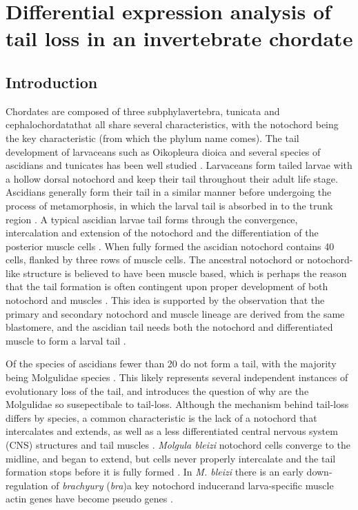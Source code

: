 \chapter{Differential expression analysis of tail loss in an invertebrate chordate}

\section{Introduction}

Chordates are composed of three subphyla\textemdash vertebra, tunicata and cephalochordata\textemdash that all share several characteristics, with the notochord being the key characteristic (from which the phylum name comes). The tail development of larvaceans such as Oikopleura dioica and several species of ascidians and tunicates has been well studied \cite{jeffery_factors_1992,nakatani_mutations_1999,kugler_evolutionary_2011}. Larvaceans form tailed larvae with a hollow dorsal notochord and keep their tail throughout their adult life stage. Ascidians generally form their tail in a similar manner before undergoing the process of metamorphosis, in which the larval tail is absorbed in to the trunk region \cite{paris_history_2008}. A typical ascidian larvae tail forms through the convergence, intercalation and extension of the notochord and the differentiation of the posterior muscle cells \cite{swalla_mechanisms_1993}. When fully formed the ascidian notochord contains 40 cells, flanked by three rows of muscle cells. The ancestral notochord or notochord-like structure is believed to have been muscle based, which is perhaps the reason that the tail formation is often contingent upon proper development of both notochord and muscles \cite{lauri_development_2014}. This idea is supported by the observation that the primary and secondary notochord and muscle lineage are derived from the same blastomere, and the ascidian tail needs both the notochord and differentiated muscle to form a larval tail \cite{nishida_cell_1987,di_gregorio_tail_2002}.

Of the  species of ascidians fewer than 20 do not form a tail, with the majority being Molgulidae species \cite{berrill_studies_1931,huber_evolution_2000}. This likely represents several independent instances of evolutionary loss of the tail, and introduces the question of why are the Molgulidae so susepectibale to tail-loss. Although the mechanism behind tail-loss differs by species, a common characteristic is the lack of a notochord that intercalates and extends, as well as a less differentiated central nervous system (CNS) structures and tail muscles \cite{swalla_mechanisms_1993}. \textit{Molgula bleizi} notochord cells converge to the midline, and began to extend, but cells never properly intercalate and the tail formation stops before it is fully formed \cite{jeffery_evolution_1999}. In \textit{M. bleizi} there is an early down-regulation of \textit{brachyury} (\textit{bra})\textemdash a key notochord inducer\textemdash and larva-specific muscle actin genes have become pseudo genes \cite{jeffery_evolution_1999}.   

